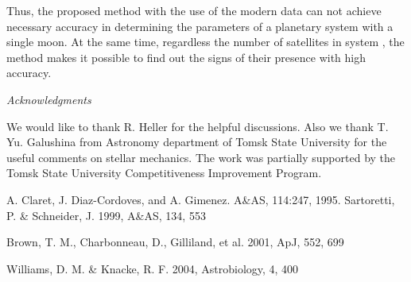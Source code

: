 \documentclass[12pt]{article}
\begin{document}
 Thus, the proposed method with the use of the modern data can not achieve necessary accuracy in determining the parameters of a planetary system with a single moon. At the same time, regardless the number of satellites in system , the method makes it possible to find out the signs of their presence with high accuracy.
 
 
 \textit{Acknowledgments} 
 
 We would like to thank R. Heller for the helpful discussions. 
 Also we thank T. Yu. Galushina from Astronomy department of Tomsk State University for the useful comments on stellar mechanics.
 The work was partially supported by the Tomsk State University Competitiveness Improvement Program.

 
 
 
 
 
 \begin{thebibliography}{}
 A. Claret, J. Diaz-Cordoves, and A. Gimenez. A\&AS, 114:247, 1995. 
 Sartoretti, P. \& Schneider, J. 1999, A\&AS, 134, 553

 Brown, T. M., Charbonneau, D., Gilliland, et al. 2001, ApJ, 552, 699

 Williams, D. M. \& Knacke, R. F. 2004, Astrobiology, 4, 400


\end{thebibliography}
\end{document}
